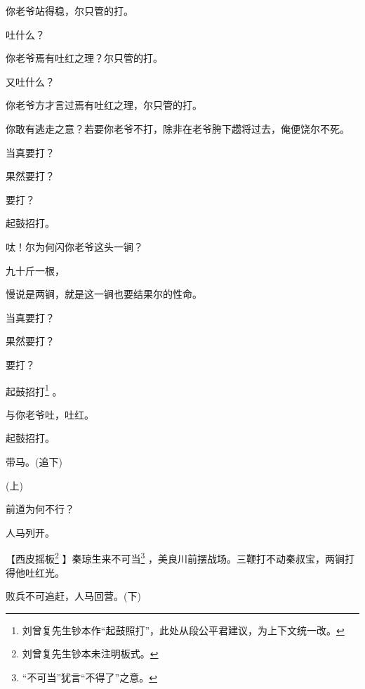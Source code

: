 {你老爷站得稳，尔只管的打。

吐什么？

你老爷焉有吐红之理？尔只管的打。

又吐什么？

你老爷方才言过焉有吐红之理，尔只管的打。

你敢有逃走之意？若要你老爷不打，除非在老爷胯下趱将过去，俺便饶尔不死。

当真要打？

果然要打？

要打？

起鼓招打。

呔！尔为何闪你老爷这头一锏？

九十斤一根，

慢说是两锏，就是这一锏也要结果尔的性命。

当真要打？

果然要打？

要打？

起鼓招打\footnote{刘曾复先生钞本作``起鼓照打''，此处从段公平{\scriptsize 君}建议，为上下文统一改。}
。

与你老爷吐，吐红。

起鼓招打。

带马。({\hwfs 追下})

\vspace{5pt}

({\hwfs 上})

前道为何不行？

人马列开。

【{\akai 西皮摇板\footnote{刘曾复先生钞本未注明板式。}%
}】秦琼生来不可当\footnote{``不可当''犹言``不得了''之意。}
，美良川前摆战场。三鞭打不动秦叔宝，两锏打得他吐红光。

败兵不可追赶，人马回营。({\hwfs 下})}

